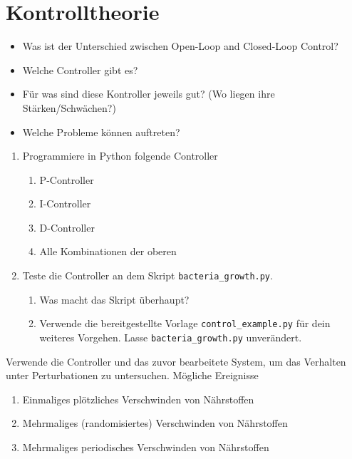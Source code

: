 \section{Kontrolltheorie}
\begin{itemize}
    \item Was ist der Unterschied zwischen Open-Loop and Closed-Loop Control?
    \item Welche Controller gibt es?
    \item Für was sind diese Kontroller jeweils gut? (Wo liegen ihre Stärken/Schwächen?)
    \item Welche Probleme können auftreten?
\end{itemize}
%
\begin{enumerate}
    \item Programmiere in Python folgende Controller
    \begin{enumerate}
        \item P-Controller
        \item I-Controller
        \item D-Controller
        \item Alle Kombinationen der oberen
    \end{enumerate}
    \item Teste die Controller an dem Skript \texttt{bacteria\_growth.py}.
    \begin{enumerate}
        \item Was macht das Skript überhaupt?
        \item Verwende die bereitgestellte Vorlage \texttt{control\_example.py} für dein weiteres Vorgehen.
        Lasse \texttt{bacteria\_growth.py} unverändert.
    \end{enumerate}
\end{enumerate}
%
%
Verwende die Controller und das zuvor bearbeitete System, um das Verhalten unter Perturbationen zu untersuchen.
Mögliche Ereignisse
\begin{enumerate}
    \item Einmaliges plötzliches Verschwinden von Nährstoffen
    \item Mehrmaliges (randomisiertes) Verschwinden von Nährstoffen
    \item Mehrmaliges periodisches Verschwinden von Nährstoffen
\end{enumerate}
